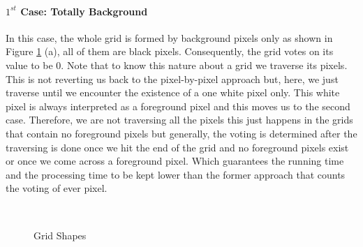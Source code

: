\documentclass[12pt,fleqn]{book} %
\begin{document}
\paragraph{$1^{st}$ Case: Totally Background}
In this case, the whole grid is formed by background pixels only as shown in Figure \ref{fig:vote_cases_d} (a), all of them are black pixels. Consequently, the grid votes on its value to be 0. Note that to know this nature about a grid we traverse its pixels. This is not reverting us back to the pixel-by-pixel approach but, here, we just traverse until we encounter the existence of a one white pixel only. This white pixel is always interpreted as a foreground pixel and this moves us to the second case. Therefore, we are not traversing all the pixels this just happens in the grids that contain no foreground pixels but generally, the voting is determined after the traversing is done once we hit the end of the grid and no foreground pixels exist or once we come across a foreground pixel. Which guarantees the running time and the processing time to be kept lower than the former approach that counts the voting of ever pixel.
\begin{figure}[h]
\begin{dBox}
\centering
  \mbox{
   }
   \caption{Grid Shapes \label{fig:vote_cases_d} }   
\end{dBox}   
\end{figure}
\end{document}
